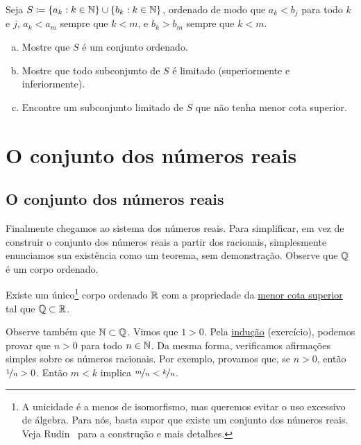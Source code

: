 \begin{exercise}
Seja $S \coloneqq \{ a_k : k \in {\mathbb{N}} \} \cup \{ b_k : k \in {\mathbb{N}} \}$, ordenado de modo que
$a_k < b_j$ para todo $k$ e $j$,
$a_k < a_m$ sempre que $k < m$,
e $b_k > b_m$ sempre que $k < m$.
\begin{enumerate}[a)]
\item
Mostre que $S$ é um conjunto ordenado.
\item
Mostre que todo subconjunto de $S$ é limitado (superiormente e inferiormente).
\item
Encontre um subconjunto limitado de $S$ que não tenha menor cota superior.
\end{enumerate}
\end{exercise}


\sectionnewpage

\section{O conjunto dos números reais} \label{sec:setofreals}



\subsection{O conjunto dos números reais}

Finalmente chegamos ao sistema dos números reais. Para simplificar, em vez de
construir o conjunto dos números reais a partir dos racionais, simplesmente
enunciamos sua existência como um teorema, sem demonstração. Observe que ${\mathbb{Q}}$ é um corpo
ordenado.

\begin{thm}
Existe um único\footnote{A unicidade é a menos de isomorfismo, mas queremos
evitar o uso excessivo de álgebra. Para nós, basta supor
que existe um conjunto dos números reais. Veja Rudin~\cite{Rudin:baby} para a
construção e mais detalhes.}
corpo ordenado ${\mathbb{R}}$ com a propriedade da
\hyperref[defn:lub]{menor cota superior}
tal que ${\mathbb{Q}} \subset {\mathbb{R}}$.
\end{thm}

Observe também que ${\mathbb{N}} \subset {\mathbb{Q}}$. Vimos que $1 > 0$.
Pela \hyperref[induction:thm]{indução} (exercício),
podemos provar que $n > 0$ para todo $n \in {\mathbb{N}}$.
Da mesma forma, verificamos afirmações simples sobre os números racionais.
Por exemplo, provamos que, se $n > 0$, então $\nicefrac{1}{n} > 0$.
Então $m < k$ implica $\nicefrac{m}{n} < \nicefrac{k}{n}$.

